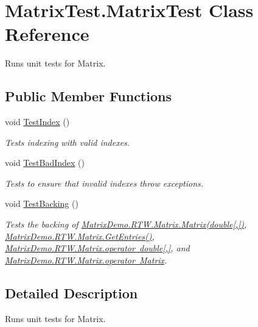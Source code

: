 \hypertarget{class_matrix_test_1_1_matrix_test}{}\section{Matrix\+Test.\+Matrix\+Test Class Reference}
\label{class_matrix_test_1_1_matrix_test}


Runs unit tests for Matrix.  


\subsection*{Public Member Functions}
\begin{DoxyCompactItemize}
\item 
void \mbox{\hyperlink{class_matrix_test_1_1_matrix_test_a0b1c95f31d09e8a879d2b36acf4c3e87}{Test\+Index}} ()
\begin{DoxyCompactList}\small\item\em Tests indexing with valid indexes. \end{DoxyCompactList}\item 
void \mbox{\hyperlink{class_matrix_test_1_1_matrix_test_abe913795621ee7220dbcbc08f38942c7}{Test\+Bad\+Index}} ()
\begin{DoxyCompactList}\small\item\em Tests to ensure that invalid indexes throw exceptions. \end{DoxyCompactList}\item 
void \mbox{\hyperlink{class_matrix_test_1_1_matrix_test_a0e036091518dbda0ebe507b7d45c2fad}{Test\+Backing}} ()
\begin{DoxyCompactList}\small\item\em Tests the backing of \mbox{\hyperlink{class_matrix_demo_1_1_r_t_w_1_1_matrix_ad2a320fd0c86551f34070679fd43433c}{Matrix\+Demo.\+R\+T\+W.\+Matrix.\+Matrix(double\mbox{[},\mbox{]})}}, \mbox{\hyperlink{class_matrix_demo_1_1_r_t_w_1_1_matrix_a9f6f8e0e7acfbdd55852f258daf68b8f}{Matrix\+Demo.\+R\+T\+W.\+Matrix.\+Get\+Entries()}}, \mbox{\hyperlink{class_matrix_demo_1_1_r_t_w_1_1_matrix_ac23641ac04b3c3baf14174bdf9049db2}{Matrix\+Demo.\+R\+T\+W.\+Matrix.\+operator double\mbox{[},\mbox{]}}}, and \mbox{\hyperlink{class_matrix_demo_1_1_r_t_w_1_1_matrix_a0c737f7e6b54edac4d26b4f1c595ee92}{Matrix\+Demo.\+R\+T\+W.\+Matrix.\+operator Matrix}}. \end{DoxyCompactList}\end{DoxyCompactItemize}


\subsection{Detailed Description}
Runs unit tests for Matrix. 



